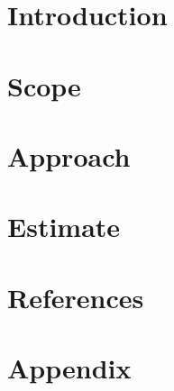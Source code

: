 \documentclass{article}
\title{}
\author{}
\date{}
\begin{document}

    
    \tableofcontents
    \listoffigures

    \newpage
    \begin{versionhistory}
    \end{versionhistory}
    \newpage

    \section{Introduction}

    \section{Scope}

    \section{Approach}

    \section{Estimate}
    
    \section{References}

    \appendix
    \section{Appendix}
\end{document}
